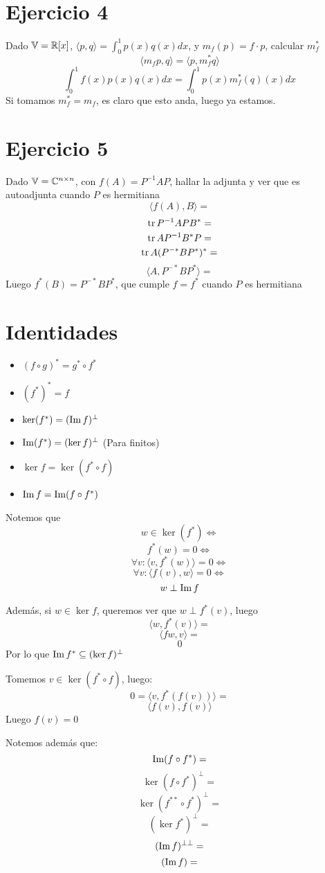 \documentclass{article}
\begin{document}
\section*{Ejercicio 4}
Dado $\mathbb{V} = \mathbb{R}[x]$, $\langle p, q \rangle = \int_0^1 p(x)q(x) dx$, y $m_f(p) = f \cdot p$, calcular $m_f^*$
\[\langle m_f p, q\rangle = \langle p, m_f^* q \rangle\]
\[\int_0^1 f(x)p(x)q(x) dx = \int_0^1 p(x) m_f^*(q)(x) dx\]
Si tomamos $m_f^* = m_f$, es claro que esto anda, luego ya estamos.

\section*{Ejercicio 5}
Dado $\mathbb{V} = \mathbb{C}^{n \times n}$, con $f(A) = P^{-1}AP$, hallar la adjunta y ver que es autoadjunta cuando $P$ es hermitiana
\[\langle f(A), B \rangle =\]
\[\operatorname{tr} P^{-1}APB^* =\]
\[\operatorname{tr} AP^{-1}B^*P =\]
\[\operatorname{tr} A(P^{-*}BP^*)^* =\]
\[\langle A, P^{-*}BP^* \rangle =\]
Luego $f^*(B) = P^{-*}BP^*$, que cumple $f = f^*$ cuando $P$ es hermitiana

\section*{Identidades}
\begin{itemize}
    \item $(f \circ g)^* = g^* \circ f^*$
    \item $(f^*)^* = f$
    \item $\ker (f^*) = (\operatorname{Im} f)^\perp$
    \item $\operatorname{Im} (f^*) = (\ker f)^\perp$ (Para finitos)
    \item $\ker f = \ker (f^* \circ f)$
    \item $\operatorname{Im} f = \operatorname{Im} (f \circ f^*)$
\end{itemize}
Notemos que 
\[w \in \ker (f^*) \iff\]
\[f^*(w) = 0 \iff\]
\[\forall v : \langle v, f^*(w) \rangle = 0 \iff\]
\[\forall v : \langle f(v), w \rangle = 0 \iff\]
\[w \perp \operatorname{Im} f\]

Además, si $w \in \ker f$, queremos ver que $w \perp f^*(v)$, luego
\[\langle w, f^*(v) \rangle =\]
\[\langle fw, v \rangle =\]
\[0\]
Por lo que $\operatorname{Im} f^* \subseteq (\ker f) ^ \perp$

Tomemos $v \in \ker (f^* \circ f)$, luego:
\[
    0 = \langle v, f^*(f(v)) \rangle =
\]
\[
    \langle f(v), f(v) \rangle
\]
Luego $f(v) = 0$

Notemos además que:
\[
\operatorname{Im} (f \circ f^*) = \]
\[\ker (f \circ f^*)^\perp =\]
\[\ker (f^{**} \circ f^*)^\perp =\]
\[(\ker f^*)^\perp =\]
\[(\operatorname{Im} f)^{\perp\perp} =\]
\[(\operatorname{Im} f) =\]
\end{document}

